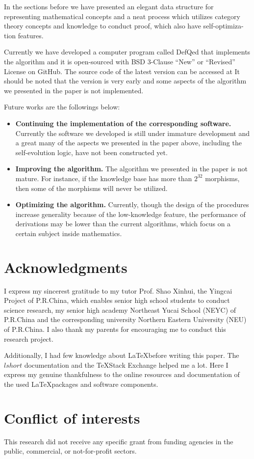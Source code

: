 \documentclass{aims}
\numberwithin{equation}{section}
\numberwithin{theorem}{section}	%
\numberwithin{axiom}{section}	%
\numberwithin{definition}{section}	%
\begin{document}
	In the sections before we have presented an elegant data structure for representing mathematical concepts and a neat process which utilizes category theory concepts and knowledge to conduct proof, which also have self-optimiza-tion features.
	
	Currently we have developed a computer program called DefQed that implements the algorithm and it is open-sourced with BSD 3-Clause {``}New{''} or {``}Revised{''} License on GitHub. The source code of the latest version can be accessed at \cite{Wang2022} It should be noted that the version is very early and some aspects of the algorithm we presented in the paper is not implemented.
	
	Future works are the followings below:
	\begin{itemize}
		\item \textbf{Continuing the implementation of the corresponding software.} Currently the software we developed is still under immature development and a great many of the aspects we presented in the paper above, including the self-evolution logic, have not been constructed yet.
		\item  \textbf{Improving the algorithm.} The algorithm we presented in the paper is not mature. For instance, if the knowledge base has more than \(2^{32}\) morphisms, then some of the morphisms will never be utilized.
		\item \textbf{Optimizing the algorithm.} Currently, though the design of the procedures increase generality because of the low-knowledge feature, the performance of derivations may be lower than the current algorithms, which focus on a certain subject inside mathematics.
	\end{itemize}
	
	\section{Acknowledgments}
	I express my sincerest gratitude to my tutor Prof. Shao Xinhui, the Yingcai Project of P.R.China, which enables senior high school students to conduct science research, my senior high academy Northeast Yucai School (NEYC) of P.R.China and the corresponding university Northern Eastern University (NEU) of P.R.China. I also thank my parents for encouraging me to conduct this research project.
	
	Additionally, I had few knowledge about \LaTeX before writing this paper. The $lshort$ documentation and the \TeX Stack Exchange helped me a lot. Here I express my genuine thankfulness to the online resources and documentation of the used \LaTeX packages and software components. 
	
	\section*{Conflict of interests}
	This research did not receive any specific grant from funding agencies in the public, commercial, or
	not-for-profit sectors.
	
%	
	
	
\end{document}
